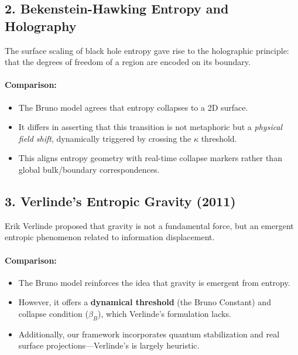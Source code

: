 \documentclass[12pt]{article}
\begin{document}
\clearpage
\subsection*{2. Bekenstein-Hawking Entropy and Holography}

The surface scaling of black hole entropy gave rise to the holographic principle: that the degrees of freedom of a region are encoded on its boundary.

\paragraph{Comparison:}
\begin{itemize}
  \item The Bruno model agrees that entropy collapses to a 2D surface.
  \item It differs in asserting that this transition is not metaphoric but a \textit{physical field shift}, dynamically triggered by crossing the $\kappa$ threshold.
  \item This aligns entropy geometry with real-time collapse markers rather than global bulk/boundary correspondences.
\end{itemize}

\clearpage
\subsection*{3. Verlinde’s Entropic Gravity (2011)}
\FloatBarrier

Erik Verlinde proposed that gravity is not a fundamental force, but an emergent entropic phenomenon related to information displacement.

\paragraph{Comparison:}
\begin{itemize}
  \item The Bruno model reinforces the idea that gravity is emergent from entropy.
  \item However, it offers a \textbf{dynamical threshold} (the Bruno Constant) and collapse condition ($\beta_B$), which Verlinde’s formulation lacks.
  \item Additionally, our framework incorporates quantum stabilization and real surface projections—Verlinde's is largely heuristic.
\end{itemize}
\FloatBarrier

\clearpage
\end{document}
